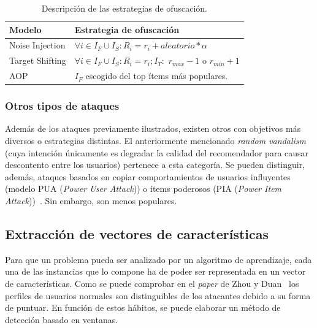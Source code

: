 \begin{table}
\small
\begin{centering}
	
		\begin{tabular}{@{}p{10em} p{20em}@{}}
		\toprule
		\textbf{Modelo} & \textbf{Estrategia de ofuscación}\\ 
		\midrule
			
		Noise Injection & $\forall i \in I_F \cup I_S: R_i = r_i + aleatorio * \alpha$\\
		Target Shifting & $\forall i \in I_F \cup I_S: R_i = r_i; I_T:$ $r_{max}-1$ o $r_{min}+1$\\
		AOP & $I_F$ escogido del top ítems más populares.\\
			
		\bottomrule
		\end{tabular}

\end{centering}
\caption[Sistemas de recomendación: estrategias de ofuscación]{Descripción de las estrategias de ofuscación.}	\label{tabla_descripcion_estrategias_ofuscación}
\end{table}

\subsubsection{Otros tipos de ataques}

Además de los ataques previamente ilustrados, existen otros con objetivos más diversos o estrategias distintas. El anteriormente mencionado \textit{random vandalism} (cuya intención únicamente es degradar la calidad del recomendador para causar descontento entre los usuarios) pertenece a esta categoría. Se pueden distinguir, además, ataques basados en copiar comportamientos de usuarios influyentes (modelo PUA (\textit{Power User Attack})) o ítems poderosos (PIA (\textit{Power Item Attack}))~\cite{mingdan2018ShillingAttacksAReview}. Sin embargo, son menos populares.

\subsection{Extracción de vectores de características}
\label{sec:vectores_catacterísticas_ataquesisrec}

Para que un problema pueda ser analizado por un algoritmo de aprendizaje, cada una de las instancias que lo compone ha de poder ser representada en un vector de características. Como se puede comprobar en el \textit{paper} de Zhou y Duan~\cite{zhou2021SemisupervisedRecommendationAttack} los perfiles de usuarios normales son distinguibles de los atacantes debido a su forma de puntuar. En función de estos hábitos, se puede elaborar un método de detección basado en ventanas.

